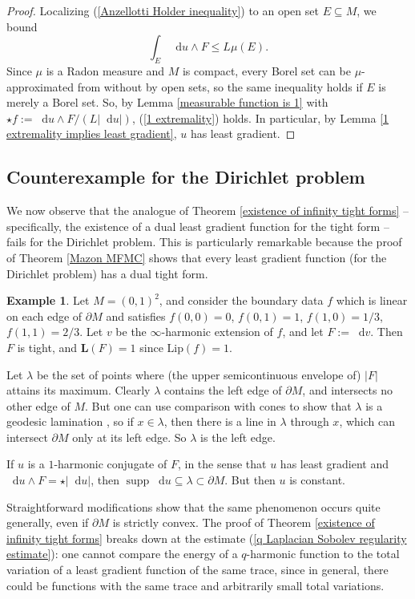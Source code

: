 \documentclass[reqno,11pt]{amsart}
\newcommand*\dif{\mathop{}\!\mathrm{d}}
\DeclareMathOperator{\supp}{supp}
\newcommand{\Lip}{\mathrm{Lip}}
\newcommand{\Comass}{\mathbf L}
\theoremstyle{definition}
\newtheorem{example}[theorem]{Example}
\numberwithin{equation}{section}
\begin{document}
\begin{proof}
Localizing (\ref{Anzellotti Holder inequality}) to an open set $E \subseteq M$, we bound
$$\int_E \dif u \wedge F \leq L \mu(E).$$
Since $\mu$ is a Radon measure and $M$ is compact, every Borel set can be $\mu$-approximated from without by open sets, so the same inequality holds if $E$ is merely a Borel set.
So, by Lemma \ref{measurable function is 1} with $\star f := \dif u \wedge F/(L|\dif u|)$, (\ref{1 extremality}) holds.
In particular, by Lemma \ref{1 extremality implies least gradient}, $u$ has least gradient.
\end{proof}

\subsection{Counterexample for the Dirichlet problem}\label{boundaries bad}
We now observe that the analogue of Theorem \ref{existence of infinity tight forms} -- specifically, the existence of a dual least gradient function for the tight form -- fails for the Dirichlet problem.
This is particularly remarkable because the proof of Theorem \ref{Mazon MFMC} shows that every least gradient function (for the Dirichlet problem) has a dual tight form.

\begin{example}
Let $M = (0, 1)^2$, and consider the boundary data $f$ which is linear on each edge of $\partial M$ and satisfies $f(0, 0) = 0$, $f(0, 1) = 1$, $f(1, 0) = 1/3$, $f(1, 1) = 2/3$.
Let $v$ be the $\infty$-harmonic extension of $f$, and let $F := \dif v$.
Then $F$ is tight, and $\Comass(F) = 1$ since $\Lip(f) = 1$.

Let $\lambda$ be the set of points where (the upper semicontinuous envelope of) $|F|$ attains its maximum.
Clearly $\lambda$ contains the left edge of $\partial M$, and intersects no other edge of $M$.
But one can use comparison with cones to show that $\lambda$ is a geodesic lamination \cite[\S5]{daskalopoulos2020transverse}, so if $x \in \lambda$, then there is a line in $\lambda$ through $x$, which can intersect $\partial M$ only at its left edge.
So $\lambda$ is the left edge.

If $u$ is a $1$-harmonic conjugate of $F$, in the sense that $u$ has least gradient and $\dif u \wedge F = \star |\dif u|$, then $\supp \dif u \subseteq \lambda \subset \partial M$.
But then $u$ is constant.
\end{example}

Straightforward modifications show that the same phenomenon occurs quite generally, even if $\partial M$ is strictly convex.
The proof of Theorem \ref{existence of infinity tight forms} breaks down at the estimate (\ref{q Laplacian Sobolev regularity estimate}): one cannot compare the energy of a $q$-harmonic function to the total variation of a least gradient function of the same trace, since in general, there could be functions with the same trace and arbitrarily small total variations.
\end{document}
